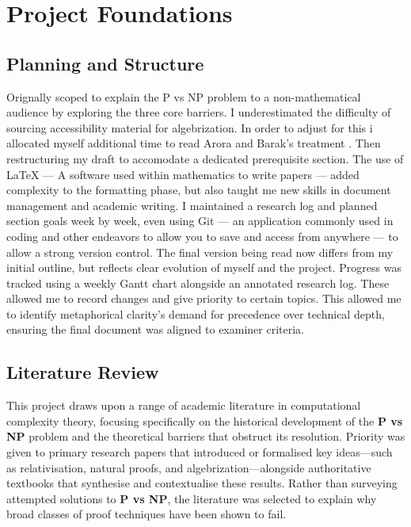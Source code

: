 \documentclass[12pt]{report}
\begin{document}
\chapter*{Project Foundations}
\section*{Planning and Structure}
Orignally scoped to explain the P vs NP problem to a non-mathematical audience by exploring the three core barriers.
I underestimated the difficulty of sourcing accessibility material for algebrization.
In order to adjust for this i allocated myself additional time to read Arora and Barak's treatment \cite{arora2008algebrization}.
Then restructuring my draft to accomodate a dedicated prerequisite section.
The use of LaTeX --- A software used within mathematics to write papers --- added complexity to the formatting phase, but also taught me new skills in document management and academic writing.
I maintained a research log and planned section goals week by week, even using Git --- an application commonly used in coding and other endeavors to allow you to save and access from anywhere --- to allow a strong version control.
The final version being read now differs from my initial outline, but reflects clear evolution of myself and the project.
Progress was tracked using a weekly Gantt chart alongside an annotated research log.
These allowed me to record changes and give priority to certain topics.
This allowed me to identify metaphorical clarity's demand for precedence over technical depth, ensuring the final document was aligned to examiner criteria.

\section*{Literature Review}

This project draws upon a range of academic literature in computational complexity theory, focusing specifically on the historical development of the \textbf{P vs NP} problem and the theoretical barriers that obstruct its resolution.
Priority was given to primary research papers that introduced or formalised key ideas—such as relativisation, natural proofs, and algebrization—alongside authoritative textbooks that synthesise and contextualise these results.
Rather than surveying attempted solutions to \textbf{P vs NP}, the literature was selected to explain why broad classes of proof techniques have been shown to fail.
\end{document}
